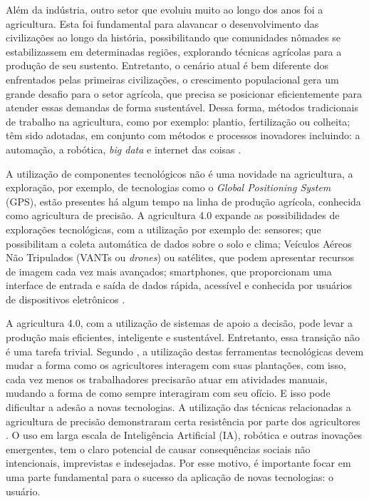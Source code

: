 \documentclass[12pt]{article}
\begin{document}
Além da indústria, outro setor que evoluiu muito ao longo dos anos foi a agricultura. Esta foi fundamental para alavancar o desenvolvimento das civilizações ao longo da história, possibilitando que comunidades nômades se estabilizassem em determinadas regiões, explorando técnicas agrícolas para a produção de seu sustento. Entretanto, o cenário atual é bem diferente dos enfrentados pelas primeiras civilizações, o crescimento populacional gera um grande desafio para o setor agrícola, que precisa se posicionar eficientemente para atender essas demandas de forma sustentável. Dessa forma, métodos tradicionais de trabalho na agricultura, como por exemplo: plantio, fertilização ou colheita; têm sido adotadas, em conjunto com métodos e processos inovadores incluindo: a automação, a robótica, \textit{big data} e internet das coisas \cite{Ribeiro:2018}.

A utilização de componentes tecnológicos não é uma novidade na agricultura, a exploração, por exemplo, de tecnologias como o \textit{Global Positioning System} (GPS), estão presentes há algum tempo na linha de produção agrícola, conhecida como agricultura de precisão. A agricultura 4.0 expande as possibilidades de explorações tecnológicas, com a utilização por exemplo de: sensores; que possibilitam a coleta automática de dados sobre o solo e clima; Veículos Aéreos Não Tripulados (VANTs ou \textit{drones}) ou satélites, que podem apresentar recursos de imagem cada vez mais avançados; smartphones, que proporcionam uma interface de entrada e saída de dados rápida, acessível e conhecida por usuários de dispositivos eletrônicos \cite{Shepherd:2018}.

A agricultura 4.0, com a utilização de sistemas de apoio a decisão, pode levar a produção mais eficientes, inteligente e sustentável. Entretanto, essa transição não é uma tarefa trivial. Segundo , a utilização destas ferramentas tecnológicas devem mudar a forma como os agricultores interagem com suas plantações, com isso, cada vez menos os trabalhadores precisarão atuar em atividades manuais, mudando a forma de como sempre interagiram com seu ofício. E isso pode dificultar a adesão a novas tecnologias. A utilização das técnicas relacionadas a agricultura de precisão demonstraram certa resistência por parte dos agricultores \cite{Rose:2019}. O uso em larga escala de Inteligência Artificial (IA), robótica e outras inovações emergentes, tem o claro potencial de causar consequências sociais não intencionais, imprevistas e indesejadas. Por esse motivo, é importante focar em uma parte fundamental para o sucesso da aplicação de novas tecnologias: o usuário.
\end{document}
